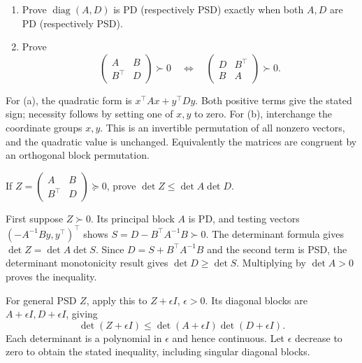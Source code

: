\begin{problem}\label{ex:09:block-sign}
\begin{enumerate}
\item Prove \(\operatorname{diag}(A,D)\) is PD (respectively PSD)
exactly when both \(A,D\) are PD (respectively PSD).
\item Prove
\[
 \begin{pmatrix}A&B\\B^\top&D\end{pmatrix}\succ0
 \quad\Longleftrightarrow\quad
 \begin{pmatrix}D&B^\top\\B&A\end{pmatrix}\succ0.
\]
\end{enumerate}
\end{problem}
\begin{solution}
For (a), the quadratic form is \(x^\top Ax+y^\top Dy\).
Both positive terms give the stated sign; necessity follows by setting
one of \(x,y\) to zero.
For (b), interchange the coordinate groups \(x,y\).
This is an invertible permutation of all nonzero vectors, and the
quadratic value is unchanged. Equivalently the matrices are congruent
by an orthogonal block permutation.
\end{solution}

\begin{problem}\label{ex:09:fischer}
If \(Z=\begin{pmatrix}A&B\\B^\top&D\end{pmatrix}\succeq0\), prove
\(\det Z\leqslant\det A\det D\).
\end{problem}
\begin{solution}
First suppose \(Z\succ0\). Its principal block \(A\) is PD, and testing
vectors \((-A^{-1}By,y^\top)^\top\) shows
\(S=D-B^\top A^{-1}B\succ0\).
The determinant formula gives \(\det Z=\det A\det S\).
Since \(D=S+B^\top A^{-1}B\) and the second term is PSD,
the determinant monotonicity result gives \(\det D\geqslant\det S\).
Multiplying by \(\det A>0\) proves the inequality.

For general PSD \(Z\), apply this to \(Z+\epsilon I\), \(\epsilon>0\).
Its diagonal blocks are \(A+\epsilon I,D+\epsilon I\), giving
\[
 \det(Z+\epsilon I)
 \leqslant\det(A+\epsilon I)\det(D+\epsilon I).
\]
Each determinant is a polynomial in \(\epsilon\) and hence continuous.
Let \(\epsilon\) decrease to zero to obtain the stated inequality,
including singular diagonal blocks.
\end{solution}

